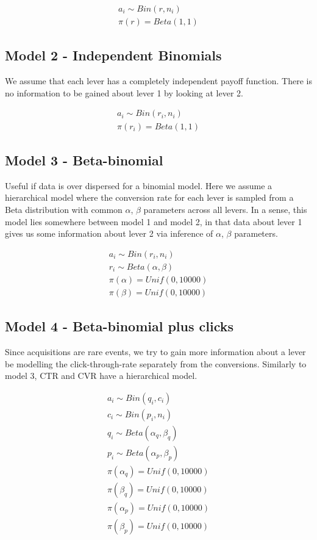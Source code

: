 \documentclass[11pt,a4,singlespacing,titlepagenumber=on]{scrreprt}
\numberwithin{equation}{chapter} %
\theoremstyle{remark}
\begin{document}
  \begin{align}
	a_i \sim Bin(r,n_i) \\
	\pi(r) = Beta(1,1)
  \end{align}

\subsection{Model 2 - Independent Binomials} 
We assume that each lever has a completely independent payoff function. There is no information to be gained about lever 1 by looking at lever 2.

  \begin{align}
	a_i \sim Bin(r_i,n_i) \\
	\pi(r_i) = Beta(1,1)
  \end{align}

\subsection{Model 3 - Beta-binomial} 
Useful if data is over dispersed for a binomial model. Here we assume a hierarchical model where the conversion rate for each lever is sampled from a Beta distribution with common $\alpha$, $\beta$ parameters across all levers. In a sense, this model lies somewhere between model 1 and model 2, in that data about lever 1 gives us some information about lever 2 via inference of $\alpha$, $\beta$ parameters. 

  \begin{align}
	a_i \sim Bin(r_i,n_i) \\
	r_i \sim Beta(\alpha,\beta) \\
	\pi(\alpha) = Unif(0,10000) \\
	\pi(\beta) = Unif(0,10000)
  \end{align}

\subsection{Model 4 - Beta-binomial plus clicks} 
Since acquisitions are rare events, we try to gain more information about a lever be modelling the click-through-rate separately from the conversions. Similarly to model 3, CTR and CVR have a hierarchical model.

  \begin{align}
	a_i \sim Bin(q_i,c_i) \\
	c_i \sim Bin(p_i,n_i) \\
	q_i \sim Beta(\alpha_q,\beta_q) \\
	p_i \sim Beta(\alpha_p,\beta_p) \\
	\pi(\alpha_q) = Unif(0,10000) \\
	\pi(\beta_q) = Unif(0,10000) \\
	\pi(\alpha_p) = Unif(0,10000) \\
	\pi(\beta_p) = Unif(0,10000) 
  \end{align}
\end{document}
